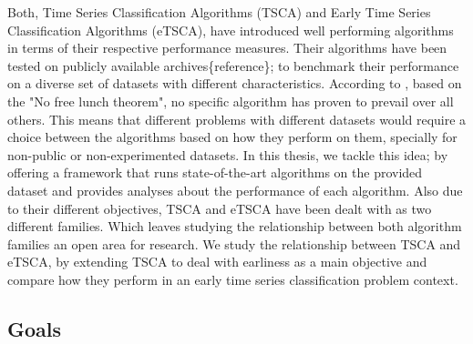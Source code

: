 Both, Time Series Classification Algorithms (TSCA) and Early Time Series Classification Algorithms (eTSCA), have introduced well performing algorithms in terms of their respective performance measures.
Their algorithms have been tested on publicly available archives\{reference\}; to benchmark their performance on a diverse set of datasets with different characteristics.\newline
According to \cite{bagnall2017great}, based on the "No free lunch theorem", no specific algorithm has proven to prevail over all others. This means that different problems with different datasets would require a choice between the algorithms based on how they perform on them, specially for non-public or non-experimented datasets.
In this thesis, we tackle this idea; by offering a framework that runs state-of-the-art algorithms on the provided dataset and provides analyses about the performance of each algorithm.\newline
Also due to their different objectives, TSCA and eTSCA have been dealt with as two different families. Which leaves studying the relationship between both algorithm families an open area for research.
We study the relationship between TSCA and eTSCA, by extending TSCA to deal with earliness as a main objective and compare how they perform in an early time series classification problem context.




\subsection*{Goals}
